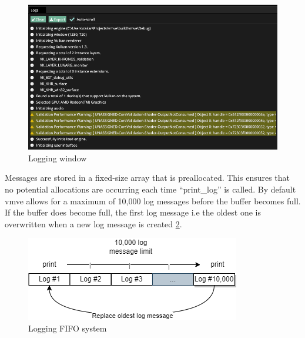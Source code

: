 \documentclass[11pt]{article}
\begin{document}
\begin{figure}[H]
  \centering
  \includegraphics[width=\textwidth]{images/logging_window.png}
  \caption{Logging window}
  \label{fig:logging_window}
\end{figure}

Messages are stored in a fixed-size array that is preallocated. This ensures
that no potential allocations are occurring each time ``print\_log''  is called.
By default \gls*{vmve} allows for a maximum of 10,000 log messages before the
buffer becomes full. If the buffer does become full, the first log message i.e
the oldest one is overwritten when a new log message is created
\ref{fig:logging_system}. 

\begin{figure}[H]
  \centering
  \includegraphics[width=\textwidth]{images/logging.png}
  \caption{Logging FIFO system}
  \label{fig:logging_system}
\end{figure}
\end{document}
